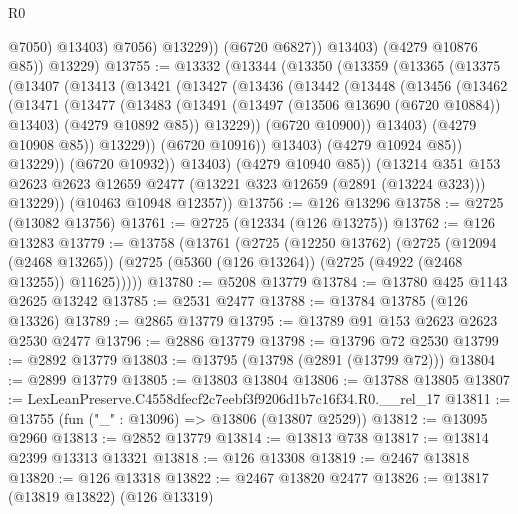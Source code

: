 \begin{lexlean}{R0}
\begin{coremodule}
                      @7050)
                    @13403)
                  @7056)
                @13229))
            (@6720 @6827))
          @13403)
        (@4279 @10876 @85))
      @13229)
@13755 := @13332
    (@13344
      (@13350
        (@13359
          (@13365
            (@13375
              (@13407
                (@13413
                  (@13421
                    (@13427
                      (@13436
                        (@13442
                          (@13448
                            (@13456
                              (@13462
                                (@13471
                                  (@13477
                                    (@13483
                                      (@13491
                                        (@13497 (@13506 @13690 (@6720 @10884)) @13403)
                                        (@4279 @10892 @85))
                                      @13229))
                                  (@6720 @10900))
                                @13403)
                              (@4279 @10908 @85))
                            @13229))
                        (@6720 @10916))
                      @13403)
                    (@4279 @10924 @85))
                  @13229))
              (@6720 @10932))
            @13403)
          (@4279 @10940 @85))
        (@13214
          @351
          @153
          @2623
          @2623
          @12659
          @2477
          (@13221 @323 @12659 (@2891 (@13224 @323)))
          @13229))
      (@10463 @10948 @12357))
@13756 := @126 @13296
@13758 := @2725 (@13082 @13756)
@13761 := @2725 (@12334 (@126 @13275))
@13762 := @126 @13283
@13779 := @13758
    (@13761
      (@2725
        (@12250 @13762)
        (@2725
          (@12094 (@2468 @13265))
          (@2725 (@5360 (@126 @13264)) (@2725 (@4922 (@2468 @13255)) @11625)))))
@13780 := @5208 @13779
@13784 := @13780 @425 @1143 @2625 @13242
@13785 := @2531 @2477
@13788 := @13784 @13785 (@126 @13326)
@13789 := @2865 @13779
@13795 := @13789 @91 @153 @2623 @2623 @2530 @2477
@13796 := @2886 @13779
@13798 := @13796 @72 @2530
@13799 := @2892 @13779
@13803 := @13795 (@13798 (@2891 (@13799 @72)))
@13804 := @2899 @13779
@13805 := @13803 @13804
@13806 := @13788 @13805
@13807 := LexLeanPreserve.C4558dfecf2c7eebf3f9206d1b7c16f34.R0.__rel_17
@13811 := @13755 (fun ("_" : @13096) => @13806 (@13807 @2529))
@13812 := @13095 @2960
@13813 := @2852 @13779
@13814 := @13813 @738
@13817 := @13814 @2399 @13313 @13321
@13818 := @126 @13308
@13819 := @2467 @13818
@13820 := @126 @13318
@13822 := @2467 @13820 @2477
@13826 := @13817 (@13819 @13822) (@126 @13319)

\end{coremodule}
\end{lexlean}
